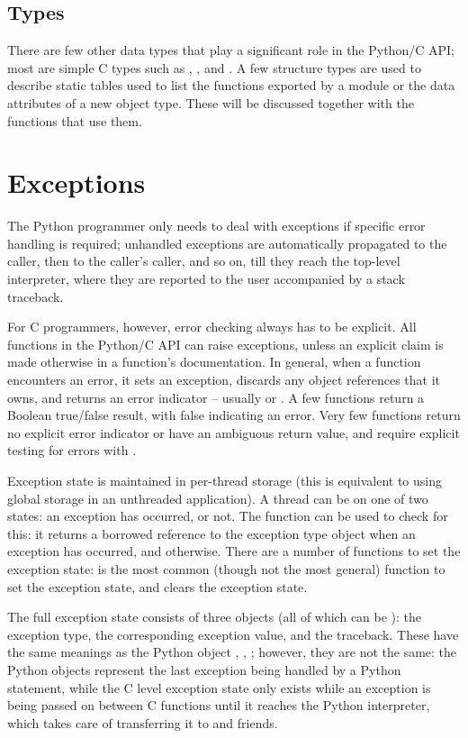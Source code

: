 \subsection{Types}

There are few other data types that play a significant role in 
the Python/C API; most are simple C types such as , 
,  and .  A few structure types 
are used to describe static tables used to list the functions exported 
by a module or the data attributes of a new object type.  These will 
be discussed together with the functions that use them.

\section{Exceptions}

The Python programmer only needs to deal with exceptions if specific 
error handling is required; unhandled exceptions are automatically 
propagated to the caller, then to the caller's caller, and so on, till 
they reach the top-level interpreter, where they are reported to the 
user accompanied by a stack traceback.

For C programmers, however, error checking always has to be explicit.  
All functions in the Python/C API can raise exceptions, unless an 
explicit claim is made otherwise in a function's documentation.  In 
general, when a function encounters an error, it sets an exception, 
discards any object references that it owns, and returns an 
error indicator -- usually \NULL{} or .  A few functions 
return a Boolean true/false result, with false indicating an error.
Very few functions return no explicit error indicator or have an 
ambiguous return value, and require explicit testing for errors with 
.

Exception state is maintained in per-thread storage (this is 
equivalent to using global storage in an unthreaded application).  A 
thread can be on one of two states: an exception has occurred, or not.  
The function  can be used to check for this: it 
returns a borrowed reference to the exception type object when an 
exception has occurred, and \NULL{} otherwise.  There are a number 
of functions to set the exception state:  is 
the most common (though not the most general) function to set the 
exception state, and  clears the exception state.

The full exception state consists of three objects (all of which can 
be \NULL{} ): the exception type, the corresponding exception 
value, and the traceback.  These have the same meanings as the Python 
object , , 
; however, they are not the same: the Python 
objects represent the last exception being handled by a Python 
 statement, while the C level exception state only 
exists while an exception is being passed on between C functions until 
it reaches the Python interpreter, which takes care of transferring it 
to  and friends.

